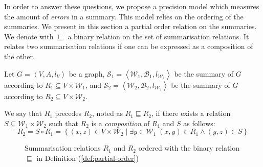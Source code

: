 In order to answer these questions, we propose a precision model which measures the amount of \emph{errors} in a summary. This model relies on the ordering of the summaries. We present in this section a partial order relation on the summaries.\\


We denote with $\sqsubseteq$ a binary relation on the set of summarisation relations. It relates two summarisation relations if one can be expressed as a composition of the other.

\begin{definition}
	Let $G=\left\langle V, A, l_V \right\rangle$ be a graph, $\mathcal{S}_1 = \left\langle \mathcal{W}_1, \mathcal{B}_1, l_{\mathcal{W}_1} \right\rangle$ be the summary of $G$ according to $R_1 \subseteq V \times \mathcal{W}_1$, and $\mathcal{S}_2 = \left\langle \mathcal{W}_2, \mathcal{B}_2, l_{\mathcal{W}_2} \right\rangle$ be the summary of $G$ according to $R_2 \subseteq V \times \mathcal{W}_2$.
	
	We say that $R_1$ precedes $R_2$, noted as $R_1 \sqsubseteq R_2$, if there exists a relation $S \subseteq \mathcal{W}_1 \times \mathcal{W}_2$ such that $R_2$ is a \emph{composition} of $R_1$ and $S$ as follows:
	$$
	R_2 = S \circ R_1 = \left\lbrace (x, z) \in V \times \mathcal{W}_2 \mid \exists y \in \mathcal{W}_1\; (x, y) \in R_1 \wedge (y, z) \in S \right\rbrace 
	$$
	\label{def:partial-order}
\end{definition}

\begin{figure}
	\centering
	\resizebox{.6\textwidth}{!}{
		
	}
	\caption{Summarisation relations $R_1$ and $R_2$ ordered with the binary relation $\sqsubseteq$ in Definition (\ref{def:partial-order})}
	\label{fig:partial-order}
\end{figure}

